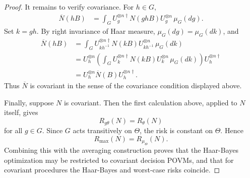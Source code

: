 \documentclass[10pt,a4paper]{amsart}
\begin{document}
\begin{proof}
It remains to verify covariance.  For \(h\in G\),
\[
\begin{aligned}
    \overline N(hB)
    &=
    \int_G
    U_g^{\otimes n\dagger}N(ghB)U_g^{\otimes n}
    \,\mu_G(dg).
\end{aligned}
\]
Set \(k=gh\).  By right invariance of Haar measure, \(\mu_G(dg)=\mu_G(dk)\), and
\[
\begin{aligned}
    \overline N(hB)
    &=
    \int_G
    U_{kh^{-1}}^{\otimes n\dagger}N(kB)U_{kh^{-1}}^{\otimes n}
    \,\mu_G(dk)                                                \\
    &=
    U_h^{\otimes n}
    \left(
        \int_G U_k^{\otimes n\dagger}N(kB)U_k^{\otimes n}
        \,\mu_G(dk)
    \right)
    U_h^{\otimes n\dagger}                                      \\
    &=
    U_h^{\otimes n}\overline N(B)U_h^{\otimes n\dagger}.
\end{aligned}
\]
Thus \(\overline N\) is covariant in the sense of
the covariance condition displayed above.

Finally, suppose \(N\) is covariant.  Then the first calculation above, applied
to \(N\) itself, gives
\[
    R_{g\theta}(N)=R_\theta(N)
\]
for all \(g\in G\).  Since \(G\) acts transitively on \(\Theta\), the risk is
constant on \(\Theta\).  Hence
\[
    R_{\max}(N)=R_{\mu_\Theta}(N).
\]
Combining this with the averaging construction proves that the Haar-Bayes
optimization may be restricted to covariant decision POVMs, and that for
covariant procedures the Haar-Bayes and worst-case risks coincide.

\end{proof}
\end{document}
